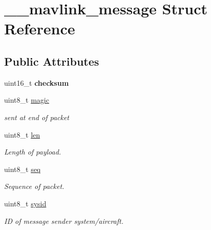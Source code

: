 \hypertarget{struct____mavlink__message}{}\section{\+\_\+\+\_\+mavlink\+\_\+message Struct Reference}
\label{struct____mavlink__message}
\subsection*{Public Attributes}
\begin{DoxyCompactItemize}
\item 
\mbox{\label{struct____mavlink__message_a8c200d7751471b5ac54d090ba279a5a6}} 
uint16\+\_\+t {\bfseries checksum}
\item 
uint8\+\_\+t \hyperlink{struct____mavlink__message_a2e6ee9d46821aea33a08231dea000355}{magic}
\begin{DoxyCompactList}\small\item\em sent at end of packet \end{DoxyCompactList}\item 
\mbox{\label{struct____mavlink__message_a6a405c678e4b9fe57e5e621c5bcd4841}} 
uint8\+\_\+t \hyperlink{struct____mavlink__message_a6a405c678e4b9fe57e5e621c5bcd4841}{len}
\begin{DoxyCompactList}\small\item\em Length of payload. \end{DoxyCompactList}\item 
\mbox{\label{struct____mavlink__message_aae05bedaab3c62acaccb416478490eff}} 
uint8\+\_\+t \hyperlink{struct____mavlink__message_aae05bedaab3c62acaccb416478490eff}{seq}
\begin{DoxyCompactList}\small\item\em Sequence of packet. \end{DoxyCompactList}\item 
\mbox{\label{struct____mavlink__message_ad4bfd4108688429b30940a35b44d4dd3}} 
uint8\+\_\+t \hyperlink{struct____mavlink__message_ad4bfd4108688429b30940a35b44d4dd3}{sysid}
\begin{DoxyCompactList}\small\item\em ID of message sender system/aircraft. \end{DoxyCompactList}\item 

\end{DoxyCompactItemize}
